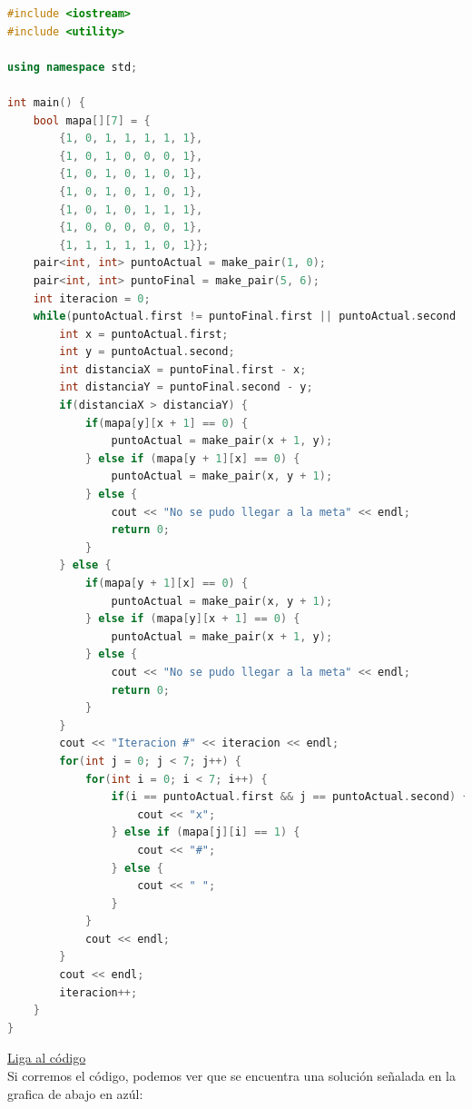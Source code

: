 \documentclass{article}
\begin{document}
\begin{lstlisting}[language=C++, caption=Camino greedy]
#include <iostream>
#include <utility>

using namespace std;

int main() {
    bool mapa[][7] = {
        {1, 0, 1, 1, 1, 1, 1},
        {1, 0, 1, 0, 0, 0, 1},
        {1, 0, 1, 0, 1, 0, 1},
        {1, 0, 1, 0, 1, 0, 1},
        {1, 0, 1, 0, 1, 1, 1},
        {1, 0, 0, 0, 0, 0, 1},
        {1, 1, 1, 1, 1, 0, 1}};
    pair<int, int> puntoActual = make_pair(1, 0);
    pair<int, int> puntoFinal = make_pair(5, 6);
    int iteracion = 0;
    while(puntoActual.first != puntoFinal.first || puntoActual.second != puntoFinal.second) {
        int x = puntoActual.first;
        int y = puntoActual.second;
        int distanciaX = puntoFinal.first - x;
        int distanciaY = puntoFinal.second - y;
        if(distanciaX > distanciaY) {
            if(mapa[y][x + 1] == 0) {
                puntoActual = make_pair(x + 1, y);
            } else if (mapa[y + 1][x] == 0) {
                puntoActual = make_pair(x, y + 1);
            } else {
                cout << "No se pudo llegar a la meta" << endl;
                return 0;
            }
        } else {
            if(mapa[y + 1][x] == 0) {
                puntoActual = make_pair(x, y + 1);
            } else if (mapa[y][x + 1] == 0) {
                puntoActual = make_pair(x + 1, y);
            } else {
                cout << "No se pudo llegar a la meta" << endl;
                return 0;
            }
        }
        cout << "Iteracion #" << iteracion << endl;
        for(int j = 0; j < 7; j++) {
            for(int i = 0; i < 7; i++) {
                if(i == puntoActual.first && j == puntoActual.second) {
                    cout << "x";
                } else if (mapa[j][i] == 1) {
                    cout << "#";
                } else {
                    cout << " ";
                }
            }
            cout << endl;
        }
        cout << endl;
        iteracion++;
    }
}
\end{lstlisting}
\href{https://repl.it/@Jamesscn/Algoritmos-Greedy}{Liga al código} \\

Si corremos el código, podemos ver que se encuentra una solución señalada en la grafica de abajo en azúl:
\end{document}
